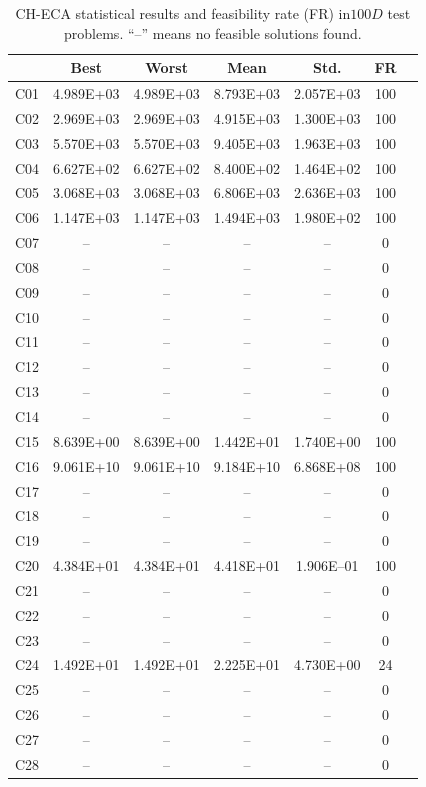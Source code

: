 \documentclass[conference]{IEEEtran}
\begin{document}
% 
% 
% 
\begin{table}[!]
	\caption{CH-ECA statistical results and feasibility rate (FR) in$100D$ test problems. ``--'' means no feasible solutions found.}
	\centering
	\begin{tabular}{|c|c|c|c|c|c|c|}
	\hline
     & Best & Worst & Mean & Std. & FR \\ \hline \hline
C01 & 4.989E+03 & 4.989E+03 & 8.793E+03 & 2.057E+03 &  100 \\ 
C02 & 2.969E+03 & 2.969E+03 & 4.915E+03 & 1.300E+03 &  100 \\ 
C03 & 5.570E+03 & 5.570E+03 & 9.405E+03 & 1.963E+03 &  100 \\ 
C04 & 6.627E+02 & 6.627E+02 & 8.400E+02 & 1.464E+02 &  100 \\ 
C05 & 3.068E+03 & 3.068E+03 & 6.806E+03 & 2.636E+03 &  100 \\ 
C06 & 1.147E+03 & 1.147E+03 & 1.494E+03 & 1.980E+02 &  100 \\ 
C07 &  -- &  -- &  -- &  -- &    0 \\ 
C08 &  -- &  -- &  -- &  -- &    0 \\ 
C09 &  -- &  -- &  -- &  -- &    0 \\ 
C10 &  -- &  -- &  -- &  -- &    0 \\ 
C11 &  -- &  -- &  -- &  -- &    0 \\ 
C12 &  -- &  -- &  -- &  -- &    0 \\ 
C13 &  -- &  -- &  -- &  -- &    0 \\ 
C14 &  -- &  -- &  -- &  -- &    0 \\ 
C15 & 8.639E+00 & 8.639E+00 & 1.442E+01 & 1.740E+00 &  100 \\ 
C16 & 9.061E+10 & 9.061E+10 & 9.184E+10 & 6.868E+08 &  100 \\ 
C17 &  -- &  -- &  -- &  -- &    0 \\ 
C18 &  -- &  -- &  -- &  -- &    0 \\ 
C19 &  -- &  -- &  -- &  -- &    0 \\ 
C20 & 4.384E+01 & 4.384E+01 & 4.418E+01 & 1.906E--01 &  100 \\ 
C21 &  -- &  -- &  -- &  -- &    0 \\ 
C22 &  -- &  -- &  -- &  -- &    0 \\ 
C23 &  -- &  -- &  -- &  -- &    0 \\ 
C24 & 1.492E+01 & 1.492E+01 & 2.225E+01 & 4.730E+00 &   24 \\ 
C25 &  -- &  -- &  -- &  -- &    0 \\ 
C26 &  -- &  -- &  -- &  -- &    0 \\ 
C27 &  -- &  -- &  -- &  -- &    0 \\ 
C28 &  -- &  -- &  -- &  -- &    0 \\ 
\hline
	\end{tabular}
	\label{tab:d100}
\end{table}
\end{document}
